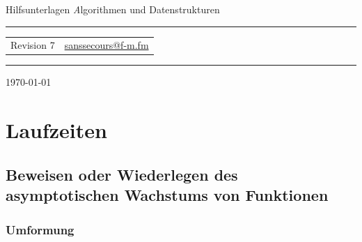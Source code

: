 \documentclass[a4paper, 12pt]{article}
\makeatletter
\newcommand{\TITLE}{Hilfsunterlagen}
\newcommand{\TITLEDESCRIPTION}{Algorithmen und Datenstrukturen}
\newcommand{\REVISION}{7}
\newcommand{\MAILONE}{\href{mailto:sanssecours@f-m.fm}{sanssecours@f-m.fm}}
\makeatother
\begin{document}
\begin{titlepage}
	\begin{center}
		{\Huge\zapfino \TITLE}
		\vskip 1cm
		{\Large\textit\TITLEDESCRIPTION}
		\vskip 2cm
		\hrule
		\vskip 0.5cm
		\begin{tabular}{p{8cm}l}
			Revision \REVISION	& \MAILONE\\
		\end{tabular}
		\vskip 0.5cm
		\hrule
		\vskip 11cm
	\end{center}
	\begin{flushright}
		\today
	\end{flushright}
\end{titlepage}


\makeatletter \renewcommand{\@dotsep}{10000} \makeatother
\newpage
\setcounter{page}{2}
\tableofcontents
\newpage
\pagestyle{scrheadings}


\begin{abstract}
	\noindent Dieser Text ist mit der Absicht entstanden zu helfen. Ich habe ihn somit natürlich nicht aus Absicht mit Fehlern gespickt. Trotzdem ist es doch sehr wahrscheinlich, dass er Fehler enthält. Ich bitte das zu Entschuldigen, und möchte damit den Hinweis geben, dass für jeglichen Inhalt dieses Textes \emph{absolut kein Gewähr auf Richtigkeit} gegeben wird.\\

	\noindent Solltet ihr Fehler im Text finden wäre es sehr nett wenn ihr mir eine \href{mailto:sanssecours@f-m.fm}{e-Mail} schreibt, damit ich sie ausbessern kann.
\end{abstract}

\section{Laufzeiten}

\subsection{Beweisen oder Wiederlegen des asymptotischen Wachstums von Funktionen}

\subsubsection{Umformung}
\end{document}
